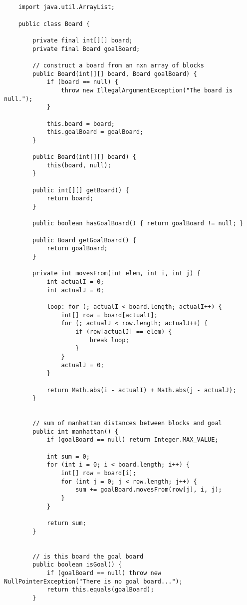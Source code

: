 \documentclass[paper=a4, fontsize=11pt]{scrartcl} %
\numberwithin{equation}{section} %
\numberwithin{figure}{section} %
\numberwithin{table}{section} %
\begin{document}
    \begin{lstlisting}


    import java.util.ArrayList;

    public class Board {

        private final int[][] board;
        private final Board goalBoard;

        // construct a board from an nxn array of blocks
        public Board(int[][] board, Board goalBoard) {
            if (board == null) {
                throw new IllegalArgumentException("The board is null.");
            }

            this.board = board;
            this.goalBoard = goalBoard;
        }

        public Board(int[][] board) {
            this(board, null);
        }

        public int[][] getBoard() {
            return board;
        }

        public boolean hasGoalBoard() { return goalBoard != null; }

        public Board getGoalBoard() {
            return goalBoard;
        }

        private int movesFrom(int elem, int i, int j) {
            int actualI = 0;
            int actualJ = 0;

            loop: for (; actualI < board.length; actualI++) {
                int[] row = board[actualI];
                for (; actualJ < row.length; actualJ++) {
                    if (row[actualJ] == elem) {
                        break loop;
                    }
                }
                actualJ = 0;
            }

            return Math.abs(i - actualI) + Math.abs(j - actualJ);
        }


        // sum of manhattan distances between blocks and goal
        public int manhattan() {
            if (goalBoard == null) return Integer.MAX_VALUE;

            int sum = 0;
            for (int i = 0; i < board.length; i++) {
                int[] row = board[i];
                for (int j = 0; j < row.length; j++) {
                    sum += goalBoard.movesFrom(row[j], i, j);
                }
            }

            return sum;
        }


        // is this board the goal board
        public boolean isGoal() {
            if (goalBoard == null) throw new NullPointerException("There is no goal board...");
            return this.equals(goalBoard);
        }


\end{lstlisting}
\end{document}
